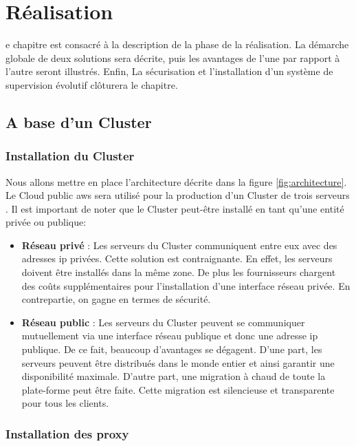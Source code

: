 \chapter{Réalisation}
\begin{onehalfspace}

e chapitre est consacré à la description de la phase de la réalisation. La démarche globale de deux solutions sera décrite, puis les avantages de l'une par rapport à l'autre seront illustrés. Enfin, La sécurisation et l'installation d'un système de supervision évolutif clôturera le chapitre.

\newpage

\section{A base d'un Cluster}

\subsection{Installation du Cluster}

Nous allons mettre en place l'architecture décrite dans la figure \ref{fig:architecture}. Le Cloud public \acrshort{aws} sera utilisé pour la production d'un Cluster de trois serveurs \cite{coreos-aws}. Il est important de noter que le Cluster peut-être installé en tant qu'une entité privée ou publique:


\begin{itemize}
	\item \textbf{Réseau privé} : Les serveurs du Cluster communiquent entre eux avec des adresses \acrshort{ip} privées. Cette solution est contraignante. En effet, les serveurs doivent être installés dans la même zone. De plus les fournisseurs chargent des coûts supplémentaires pour l'installation d'une interface réseau privée. En contrepartie, on gagne en termes de sécurité.
	\item \textbf{Réseau public} : Les serveurs du Cluster peuvent se communiquer mutuellement via une interface réseau publique et donc une adresse \acrshort{ip} publique. De ce fait, beaucoup d'avantages se dégagent. D'une part, les serveurs peuvent être distribués dans le monde entier et ainsi garantir une disponibilité maximale. D'autre part, une migration à chaud de toute la plate-forme peut être faite. Cette migration est silencieuse et transparente pour tous les clients.
\end{itemize}

\subsection{Installation des proxy}


\end{onehalfspace}
